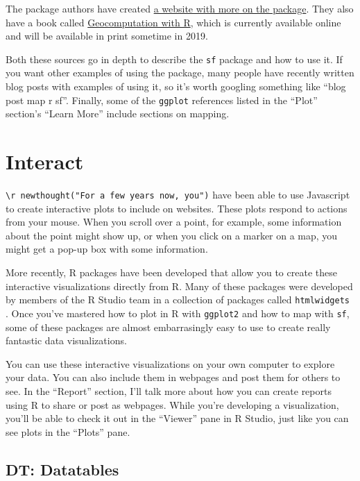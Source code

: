 \documentclass[]{tufte-book}
\begin{document}
The package authors have created
\href{https://cran.r-project.org/web/packages/sf/vignettes/sf1.html}{a website with more on the package}.
They also have a book called \href{https://geocompr.robinlovelace.net/}{Geocomputation with R}, which
is currently available online and will be available in print sometime in 2019.

Both these sources go in depth to describe the \texttt{sf} package and how to use it. If you want
other examples of using the package, many people have recently written blog posts with examples
of using it, so it's worth googling something like ``blog post map r sf''. Finally, some of the
\texttt{ggplot} references listed in the ``Plot'' section's ``Learn More'' include sections on mapping.

\hypertarget{interact}{%
\chapter{Interact}\label{interact}}

\texttt{\textbackslash{}r\ newthought("For\ a\ few\ years\ now,\ you")} have been able to use Javascript to create
interactive plots to include on
websites. These plots respond to actions from your mouse. When you scroll over a point,
for example, some information about the point might show up, or when you click on a marker
on a map, you might get a pop-up box with some information.

More recently, R packages have been developed that allow you to create these interactive
visualizations directly from R. Many of these packages were developed by members of the
R Studio team in a collection of packages called \texttt{htmlwidgets} \citep{R-htmlwidgets}. Once you've
mastered how to plot in R with \texttt{ggplot2} and how to map with \texttt{sf}, some of these packages
are almost embarrasingly easy to use to create really fantastic data visualizations.

You can use these interactive visualizations on your own computer to explore your
data. You can also include them in webpages and post them for others to see. In the
``Report'' section, I'll talk more about how you can create reports using R to share or post as
webpages. While you're developing a visualization, you'll be able to check it out in
the ``Viewer'' pane in R Studio, just like you can see plots in the ``Plots'' pane.

\hypertarget{dt-datatables}{%
\section{DT: Datatables}\label{dt-datatables}}
\end{document}
